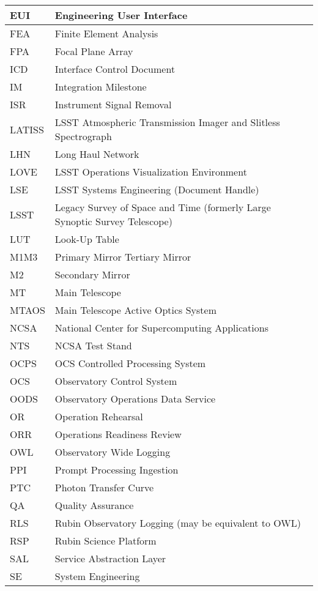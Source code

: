 \begin{longtable}{p{}p{}}
EUI & Engineering User Interface \\\hline
FEA & Finite Element Analysis \\\hline
FPA & Focal Plane Array \\\hline
ICD & Interface Control Document \\\hline
IM & Integration Milestone \\\hline
ISR & Instrument Signal Removal \\\hline
LATISS & LSST Atmospheric Transmission Imager and Slitless Spectrograph \\\hline
LHN & Long Haul Network \\\hline
LOVE & LSST Operations Visualization Environment \\\hline
LSE & LSST Systems Engineering (Document Handle) \\\hline
LSST & Legacy Survey of Space and Time (formerly Large Synoptic Survey Telescope) \\\hline
LUT & Look-Up Table \\\hline
M1M3 & Primary Mirror Tertiary Mirror \\\hline
M2 & Secondary Mirror \\\hline
MT & Main Telescope \\\hline
MTAOS & Main Telescope Active Optics System \\\hline
NCSA & National Center for Supercomputing Applications \\\hline
NTS & NCSA Test Stand \\\hline
OCPS & OCS Controlled Processing System \\\hline
OCS & Observatory Control System \\\hline
OODS & Observatory Operations Data Service \\\hline
OR & Operation Rehearsal \\\hline
ORR & Operations Readiness Review \\\hline
OWL & Observatory Wide Logging \\\hline
PPI & Prompt Processing Ingestion \\\hline
PTC & Photon Transfer Curve \\\hline
QA & Quality Assurance \\\hline
RLS & Rubin Observatory Logging (may be equivalent to OWL) \\\hline
RSP & Rubin Science Platform \\\hline
SAL & Service Abstraction Layer \\\hline
SE & System Engineering \\\hline

\end{longtable}
